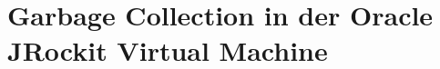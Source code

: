 \chapter{Garbage Collection in der Oracle JRockit Virtual Machine}\label{jrockit garbage collection}






